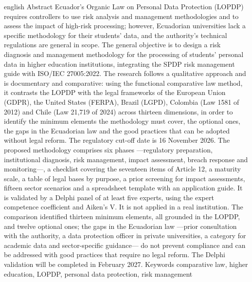 \UTIResumenPagina
  {english}
  {Abstract}
  {Ecuador's Organic Law on Personal Data Protection (LOPDP) requires controllers to use risk analysis and management methodologies and to assess the impact of high-risk processing; however, Ecuadorian universities lack a specific methodology for their students' data, and the authority's technical regulations are general in scope. The general objective is to design a risk diagnosis and management methodology for the processing of students' personal data in higher education institutions, integrating the SPDP risk management guide with ISO/IEC 27005:2022. The research follows a qualitative approach and is documentary and comparative: using the functional comparative law method, it contrasts the LOPDP with the legal frameworks of the European Union (GDPR), the United States (FERPA), Brazil (LGPD), Colombia (Law 1581 of 2012) and Chile (Law 21,719 of 2024) across thirteen dimensions, in order to identify the minimum elements the methodology must cover, the optional ones, the gaps in the Ecuadorian law and the good practices that can be adopted without legal reform. The regulatory cut-off date is 16 November 2026. The proposed methodology comprises six phases ---regulatory preparation, institutional diagnosis, risk management, impact assessment, breach response and monitoring---, a checklist covering the seventeen items of Article 12, a maturity scale, a table of legal bases by purpose, a prior screening for impact assessments, fifteen sector scenarios and a spreadsheet template with an application guide. It is validated by a Delphi panel of at least five experts, using the expert competence coefficient and Aiken's V. It is not applied in a real institution. The comparison identified thirteen minimum elements, all grounded in the LOPDP, and twelve optional ones; the gaps in the Ecuadorian law ---prior consultation with the authority, a data protection officer in private universities, a category for academic data and sector-specific guidance--- do not prevent compliance and can be addressed with good practices that require no legal reform. The Delphi validation will be completed in February 2027.}
  {Keywords}
  {comparative law, higher education, LOPDP, personal data protection, risk management}
